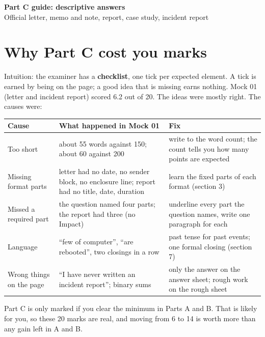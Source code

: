 \documentclass[11pt,a4paper]{article}
\newcommand{\tb}[1]{\textbf{\color{slate}#1}}
\begin{document}
\begin{center}
{\LARGE\bfseries\color{slate}Part C guide: descriptive answers}\\[2pt]
{\small Official letter, memo and note, report, case study, incident report}
\end{center}

\section{Why Part C cost you marks}
Intuition: the examiner has a \textbf{checklist}, one tick per expected element. A tick is earned by being on the page; a good idea that is missing earns nothing. Mock 01 (letter and incident report) scored 6.2 out of 20. The ideas were mostly right. The causes were:

\begin{center}\small\renewcommand{\arraystretch}{1.18}\setlength{\tabcolsep}{9pt}
\begin{tabularx}{\linewidth}{@{}YYY@{}}
\toprule
\tb{Cause} & \tb{What happened in Mock 01} & \tb{Fix} \\ \midrule
Too short & about 55 words against 150; about 60 against 200 & write to the word count; the count tells you how many points are expected \\
Missing format parts & letter had no date, no sender block, no enclosure line; report had no title, date, duration & learn the fixed parts of each format (section 3) \\
Missed a required part & the question named four parts; the report had three (no Impact) & underline every part the question names, write one paragraph for each \\
Language & ``few of computer'', ``are rebooted'', two closings in a row & past tense for past events; one formal closing (section 7) \\
Wrong things on the page & ``I have never written an incident report''; binary sums & only the answer on the answer sheet; rough work on the rough sheet \\
\bottomrule
\end{tabularx}\end{center}
Part C is only marked if you clear the minimum in Parts A and B. That is likely for you, so these 20 marks are real, and moving from 6 to 14 is worth more than any gain left in A and B.
\end{document}
